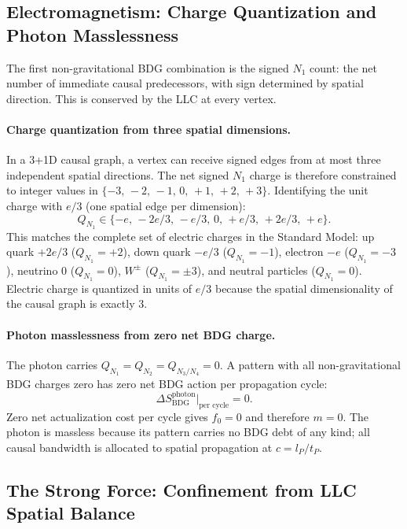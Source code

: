\documentclass[11pt,a4paper]{article}
\newcommand{\SBDG}{S_{\mathrm{BDG}}}
\begin{document}
\subsection{Electromagnetism: Charge Quantization and Photon Masslessness}

The first non-gravitational BDG combination is the signed $N_1$ count: the
net number of immediate causal predecessors, with sign determined by spatial
direction. This is conserved by the LLC at every vertex.

\paragraph{Charge quantization from three spatial dimensions.}
In a 3+1D causal graph, a vertex can receive signed edges from at most three
independent spatial directions. The net signed $N_1$ charge is therefore
constrained to integer values in $\{-3,\,-2,\,-1,\,0,\,+1,\,+2,\,+3\}$.
Identifying the unit charge with $e/3$ (one spatial edge per dimension):
\begin{equation}
  Q_{N_1} \in \{-e,\,-2e/3,\,-e/3,\,0,\,+e/3,\,+2e/3,\,+e\}.
  \label{eq:charge_quantization}
\end{equation}
This matches the complete set of electric charges in the Standard Model:
up quark $+2e/3$ ($Q_{N_1} = +2$), down quark $-e/3$ ($Q_{N_1} = -1$),
electron $-e$ ($Q_{N_1} = -3$), neutrino $0$ ($Q_{N_1} = 0$),
$W^\pm$ ($Q_{N_1} = \pm 3$), and neutral particles ($Q_{N_1} = 0$).
Electric charge is quantized in units of $e/3$ because the spatial
dimensionality of the causal graph is exactly 3.

\paragraph{Photon masslessness from zero net BDG charge.}
The photon carries $Q_{N_1} = Q_{N_2} = Q_{N_3/N_4} = 0$. A pattern with all
non-gravitational BDG charges zero has zero net BDG action per propagation cycle:
\begin{equation}
  \Delta \SBDG^{\text{photon}}\big|_{\text{per cycle}} = 0.
  \label{eq:photon_massless}
\end{equation}
Zero net actualization cost per cycle gives $f_0 = 0$ and therefore $m = 0$.
The photon is massless because its pattern carries no BDG debt of any kind;
all causal bandwidth is allocated to spatial propagation at $c = l_P/t_P$.

\subsection{The Strong Force: Confinement from LLC Spatial Balance}
\end{document}
